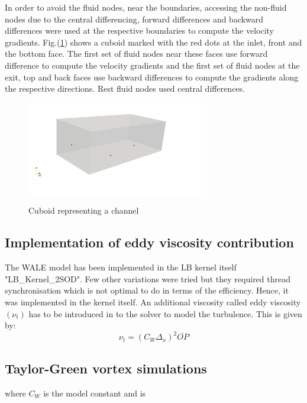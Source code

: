 In order to avoid the fluid nodes, near the boundaries, accessing the non-fluid nodes due to the central differencing, forward differences and backward differences were used at the respective boundaries to compute the velocity gradients. Fig.(\ref{Finite differences bound}) shows a cuboid marked with the red dots at the inlet, front and the bottom face. The first set of fluid nodes near these faces use forward difference to compute the velocity gradients and the first set of fluid nodes at the exit, top and back faces use backward differences to compute the gradients along the respective directions. Rest fluid nodes used central differences.

\begin{figure}[b]
\centering
\includegraphics[width=8cm]{04_Implementation/figur/3D_Domain_gradients.png}
\label{Finite differences bound}
\caption{Cuboid representing a channel}
\end{figure}
\subsection{Implementation of eddy viscosity contribution}

The WALE model has been implemented in the LB kernel itself "LB\_Kernel\_2SOD". Few other variations were tried but they required thread synchronisation which is not optimal to do in terms of the efficiency. Hence, it was implemented in the kernel itself. An additional viscosity called eddy viscosity $\left(\nu_t\right)$ has to be introduced in to the solver to model the turbulence. This is given by:
%
\begin{equation}
\label{Eddy viscosity}
\nu_t = \left(C_W \Delta_x \right)^2 \overline{OP}
\end{equation}
\subsection{Taylor-Green vortex simulations}
%
where $C_W$ is the model constant and is
\begin{figure}[h]
\begin{minipage}[b]{0.5\textwidth}
\end{minipage}
\end{figure}
%
